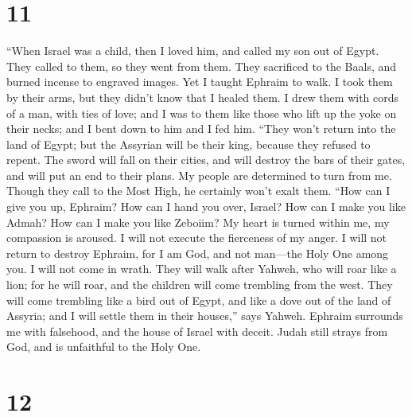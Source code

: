 \hypertarget{section-10}{%
\section{11}\label{section-10}}

 ``When Israel was a child, then I loved him, and called
my son out of Egypt.  They called to them, so they went
from them. They sacrificed to the Baals, and burned incense to engraved
images.  Yet I taught Ephraim to walk. I took them by
their arms, but they didn't know that I healed them.  I
drew them with cords of a man, with ties of love; and I was to them like
those who lift up the yoke on their necks; and I bent down to him and I
fed him.  ``They won't return into the land of Egypt; but
the Assyrian will be their king, because they refused to repent.
 The sword will fall on their cities, and will destroy the
bars of their gates, and will put an end to their plans. 
My people are determined to turn from me. Though they call to the Most
High, he certainly won't exalt them.  ``How can I give you
up, Ephraim? How can I hand you over, Israel? How can I make you like
Admah? How can I make you like Zeboiim? My heart is turned within me, my
compassion is aroused.  I will not execute the fierceness
of my anger. I will not return to destroy Ephraim, for I am God, and not
man---the Holy One among you. I will not come in wrath. 
They will walk after Yahweh, who will roar like a lion; for he will
roar, and the children will come trembling from the west.
 They will come trembling like a bird out of Egypt, and
like a dove out of the land of Assyria; and I will settle them in their
houses,'' says Yahweh.  Ephraim surrounds me with
falsehood, and the house of Israel with deceit. Judah still strays from
God, and is unfaithful to the Holy One.

\hypertarget{section-11}{%
\section{12}\label{section-11}}

